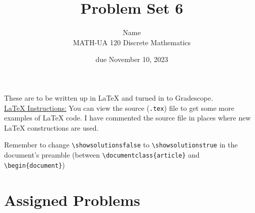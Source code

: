 \documentclass{article}
\title{Problem Set 6}
\author{%
    Name
\\  MATH-UA 120 Discrete Mathematics
}
\date{due November 10, 2023}
\newif\ifshowsolutions
\newcommand{\danger}{\marginpar[\hfill\dbend]{\dbend\hfill}}
\theoremstyle{definition}
\begin{document}
\maketitle



These are to be written up in \LaTeX{} and turned in to Gradescope.\\



\ifshowsolutions
    \SetupExSheets{solution/print=true}
\else
    \danger
 \underline{ \LaTeX{}  Instructions:}  You can view the source (\texttt{.tex}) file to get some more examples of \LaTeX{} code.  I have commented the source file in places where new \LaTeX{} constructions are used.
  
  Remember to change \verb|\showsolutionsfalse| to \verb|\showsolutionstrue|
    in the document's preamble 
    (between \verb|\documentclass{article}| and \verb|\begin{document}|)
\fi

\section*{Assigned Problems}
\end{document}
